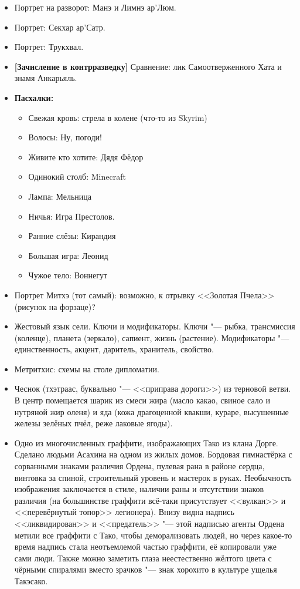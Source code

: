 \begin{itemize}
\item Портрет на разворот: Манэ и Лимнэ ар'Люм.
\item Портрет: Секхар ар'Сатр.
\item Портрет: Трукхвал.
\item \textbf{[Зачисление в контрразведку]} Сравнение: лик Самоотверженного Хата и знамя Анкарьяль.
\item \textbf{Пасхалки:}
\begin{itemize}
\item Свежая кровь: стрела в колене (что-то из Skyrim)
\item Волосы: Ну, погоди!
\item Живите кто хотите: Дядя Фёдор
\item Одинокий столб: Minecraft
\item Лампа: Мельница
\item Ничья: Игра Престолов.
\item Ранние слёзы: Кирандия
\item Большая игра: Леонид
\item Чужое тело: Воннегут
\end{itemize}
\item Портрет Митхэ (тот самый): возможно, к отрывку <<Золотая Пчела>> (рисунок на форзаце)?
\item Жестовый язык сели.
Ключи и модификаторы.
Ключи "--- рыбка, трансмиссия (коленце), планета (зеркало), сапиент, жизнь (растение).
Модификаторы "--- единственность, акцент, даритель, хранитель, свойство.
\item Метритхис: схемы на столе дипломатии.
\item Чеснок (тхэтраас, буквально "--- <<приправа дороги>>) из терновой ветви. 
В центр помещается шарик из смеси жира (масло какао, свиное сало и нутряной жир оленя) и яда (кожа драгоценной квакши, кураре, высушенные железы зелёных пчёл, реже лаковые ягоды).
\item Одно из многочисленных граффити, изображающих Тако из клана Дорге.
Сделано людьми Асахина на одном из жилых домов.
Бордовая гимнастёрка с сорванными знаками различия Ордена, пулевая рана в районе сердца, винтовка за спиной, строительный уровень и мастерок в руках.
Необычность изображения заключается в стиле, наличии раны и отсутствии знаков различия (на большинстве граффити всё-таки присутствует <<вулкан>> и <<перевёрнутый топор>> легионера).
Внизу видна надпись <<ликвидирован>> и <<предатель>> "--- этой надписью агенты Ордена метили все граффити с Тако, чтобы деморализовать людей, но через какое-то время надпись стала неотъемлемой частью граффити, её копировали уже сами люди.
Также можно заметить глаза неестественно жёлтого цвета с чёрными спиралями вместо зрачков "--- знак хорохито в культуре ущелья Такэсако.
\end{itemize}

